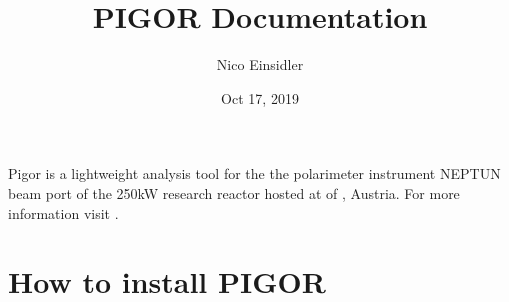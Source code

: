 \documentclass[letterpaper,10pt,english]{sphinxmanual}
\title{PIGOR Documentation}
\date{Oct 17, 2019}
\author{Nico Einsidler}
\begin{document}
\pagestyle{empty}
\sphinxmaketitle
\pagestyle{plain}
\sphinxtableofcontents
\pagestyle{normal}
\label{\detokenize{index::doc}}


Pigor is a lightweight analysis tool for the the polarimeter instrument NEPTUN beam port of the 250kW research reactor hosted at  of , Austria. For more information visit .


\chapter{How to install PIGOR}
\label{\detokenize{installation:how-to-install-pigor}}\label{\detokenize{installation::doc}}
\end{document}
